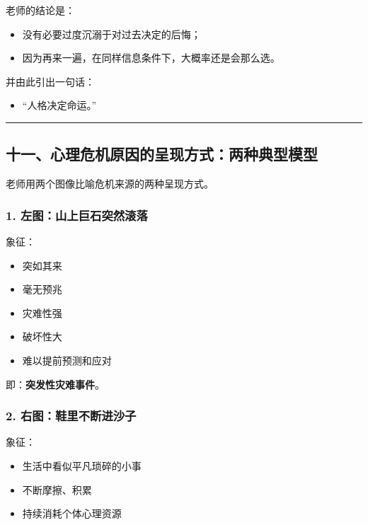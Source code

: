 \documentclass[
  chinese,
  9pt,
  a4paper,
]{ctexart}
\providecommand{\tightlist}{%
  \setlength{\itemsep}{0pt}\setlength{\parskip}{0pt}}
\begin{document}
老师的结论是：

\begin{itemize}
\tightlist
\item
  没有必要过度沉溺于对过去决定的后悔；
\item
  因为再来一遍，在同样信息条件下，大概率还是会那么选。
\end{itemize}

并由此引出一句话：

\begin{itemize}
\tightlist
\item
  ``人格决定命运。''
\end{itemize}

\begin{center}\rule{0.5\linewidth}{0.5pt}\end{center}

\subsection{十一、心理危机原因的呈现方式：两种典型模型}\label{ux5341ux4e00ux5fc3ux7406ux5371ux673aux539fux56e0ux7684ux5448ux73b0ux65b9ux5f0fux4e24ux79cdux5178ux578bux6a21ux578b}

老师用两个图像比喻危机来源的两种呈现方式。

\subsubsection{1.
左图：山上巨石突然滚落}\label{ux5de6ux56feux5c71ux4e0aux5de8ux77f3ux7a81ux7136ux6edaux843d}

象征：

\begin{itemize}
\tightlist
\item
  突如其来
\item
  毫无预兆
\item
  灾难性强
\item
  破坏性大
\item
  难以提前预测和应对
\end{itemize}

即：\textbf{突发性灾难事件}。

\subsubsection{2.
右图：鞋里不断进沙子}\label{ux53f3ux56feux978bux91ccux4e0dux65adux8fdbux6c99ux5b50}

象征：

\begin{itemize}
\tightlist
\item
  生活中看似平凡琐碎的小事
\item
  不断摩擦、积累
\item
  持续消耗个体心理资源
\end{itemize}
\end{document}
